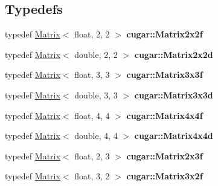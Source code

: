 \subsection*{Typedefs}
\begin{DoxyCompactItemize}
\item 
\mbox{\label{group___matrices_module_ga5a185f5a25e5a3ccabaa6f1067a7207d}} 
typedef \hyperlink{structcugar_1_1_matrix}{Matrix}$<$ float, 2, 2 $>$ {\bfseries cugar\+::\+Matrix2x2f}
\item 
\mbox{\label{group___matrices_module_ga8b9e09ca215d867acff31068deea9f10}} 
typedef \hyperlink{structcugar_1_1_matrix}{Matrix}$<$ double, 2, 2 $>$ {\bfseries cugar\+::\+Matrix2x2d}
\item 
\mbox{\label{group___matrices_module_gae656922c4160da010b4131b9c0303ead}} 
typedef \hyperlink{structcugar_1_1_matrix}{Matrix}$<$ float, 3, 3 $>$ {\bfseries cugar\+::\+Matrix3x3f}
\item 
\mbox{\label{group___matrices_module_ga278c65032f87cb87eba61dd9a7266507}} 
typedef \hyperlink{structcugar_1_1_matrix}{Matrix}$<$ double, 3, 3 $>$ {\bfseries cugar\+::\+Matrix3x3d}
\item 
\mbox{\label{group___matrices_module_ga8c8658d53f4bd32f1b75baa3d1103be7}} 
typedef \hyperlink{structcugar_1_1_matrix}{Matrix}$<$ float, 4, 4 $>$ {\bfseries cugar\+::\+Matrix4x4f}
\item 
\mbox{\label{group___matrices_module_ga7585d6ab92ecd1f8af471342e4c2a59c}} 
typedef \hyperlink{structcugar_1_1_matrix}{Matrix}$<$ double, 4, 4 $>$ {\bfseries cugar\+::\+Matrix4x4d}
\item 
\mbox{\label{group___matrices_module_gafd4ce3c23278ff47415f281fa7362021}} 
typedef \hyperlink{structcugar_1_1_matrix}{Matrix}$<$ float, 2, 3 $>$ {\bfseries cugar\+::\+Matrix2x3f}
\item 
\mbox{\label{group___matrices_module_gab30f050fde3d08e050ab033c84234ccc}} 
typedef \hyperlink{structcugar_1_1_matrix}{Matrix}$<$ float, 3, 2 $>$ {\bfseries cugar\+::\+Matrix3x2f}

\end{DoxyCompactItemize}
